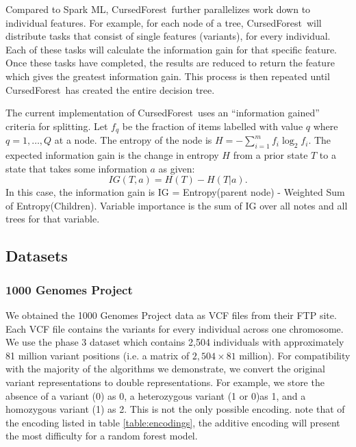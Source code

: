 \documentclass[10pt,letterpaper]{article}
\newcommand{\cursedforest}{{\sc CursedForest}}
\begin{document}
Compared to Spark ML, \cursedforest\ further parallelizes work down to individual features.  For example, for each node
of a tree, \cursedforest\ will distribute tasks that consist of single features (variants), for every individual.  Each
of these tasks will calculate the information gain for that specific feature.  Once these tasks have completed, the
results are reduced to return the feature which gives the greatest information gain.  This process is then repeated
until \cursedforest\ has created the entire decision tree.

The current implementation of \cursedforest\ uses an ``information gained'' criteria for splitting. Let $f_q$ be the
fraction of items labelled with value $q$ where $q = 1, \ldots, Q$ at a node. The entropy of the node is
$H = - \sum^{m}_{i=1} f_i \log^{}_2 f_i.$ The expected information gain is the change in entropy $H$ from a prior state
$T$ to a state that takes some information $a$ as given:
\[ IG(T,a) = H(T) - H(T|a). \]
In this case, the information gain is IG = Entropy(parent node) - Weighted Sum of Entropy(Children). 
Variable importance is the sum of IG over all notes and all trees for that variable.


\subsection{Datasets}
\subsubsection{1000 Genomes Project}
We obtained the 1000 Genomes Project data as VCF files from their FTP site.  Each VCF file contains the variants for
every individual across one chromosome.  We use the phase 3 dataset which contains 2,504 individuals with approximately
81 million variant positions (i.e. a matrix of $2,504 \times 81$ million).  For compatibility with the majority of the
algorithms we demonstrate, we convert the original variant representations to double representations.  For example, we
store the absence of a variant (0) as 0, a heterozygous variant (1 or 0)as 1, and a
homozygous variant (1) as 2.  This is not the only possible encoding.  \cite{Goldstein.et.al.2011} note that of
the encoding listed in table \ref{table:encodings}, the additive encoding will present the most difficulty for a random
forest model.
\end{document}
